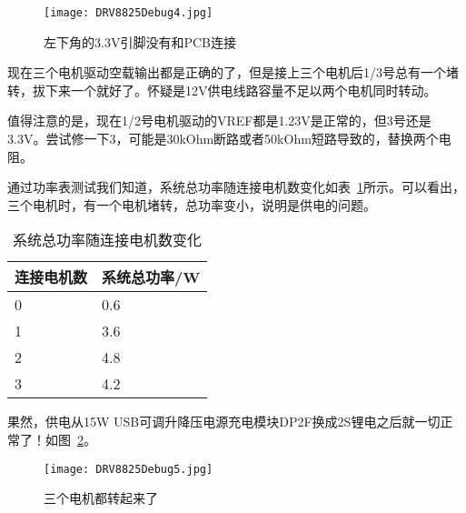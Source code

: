 \begin{figure}[htbp]
    \centering
    \texttt{[image: DRV8825Debug4.jpg]}
    \caption{左下角的3.3V引脚没有和PCB连接}
    \label{fig:DRV8825Debug4}
\end{figure}

现在三个电机驱动空载输出都是正确的了，但是接上三个电机后1/3号总有一个堵转，拔下来一个就好了。怀疑是12V供电线路容量不足以两个电机同时转动。

值得注意的是，现在1/2号电机驱动的VREF都是1.23V是正常的，但3号还是3.3V。尝试修一下3，可能是30kOhm断路或者50kOhm短路导致的，替换两个电阻。

通过功率表测试我们知道，系统总功率随连接电机数变化如表~\ref{tab:DRV8825Debug}所示。可以看出，三个电机时，有一个电机堵转，总功率变小，说明是供电的问题。

\begin{table}
    \centering
    \begin{tabular}{ll} 
    \toprule
    连接电机数 & 系统总功率/W  \\
    \hline
    0     & 0.6      \\
    1     & 3.6      \\
    2     & 4.8      \\
    3     & 4.2      \\
    \bottomrule
    \end{tabular}
    \caption{系统总功率随连接电机数变化}
    \label{tab:DRV8825Debug}
\end{table}

果然，供电从15W USB可调升降压电源充电模块DP2F换成2S锂电之后就一切正常了！如图~\ref{fig:DRV8825Debug5}。

\begin{figure}[htbp]
    \centering
    \texttt{[image: DRV8825Debug5.jpg]}
    \caption{三个电机都转起来了}
    \label{fig:DRV8825Debug5}
\end{figure}